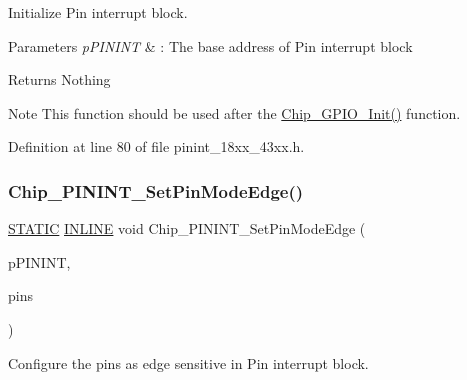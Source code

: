 Initialize Pin interrupt block. 


\begin{DoxyParams}{Parameters}
{\em p\+P\+I\+N\+I\+NT} & \+: The base address of Pin interrupt block \\
\hline
\end{DoxyParams}
\begin{DoxyReturn}{Returns}
Nothing 
\end{DoxyReturn}
\begin{DoxyNote}{Note}
This function should be used after the \hyperlink{group___g_p_i_o__18_x_x__43_x_x_gad799db2a825ded50fc7998f228db1b24}{Chip\+\_\+\+G\+P\+I\+O\+\_\+\+Init()} function. 
\end{DoxyNote}


Definition at line 80 of file pinint\+\_\+18xx\+\_\+43xx.\+h.

\mbox{\label{group___p_i_n_i_n_t__18_x_x__43_x_x_ga07505a16cf0d80d7dde607ebab062534}} 
\subsubsection{\texorpdfstring{Chip\+\_\+\+P\+I\+N\+I\+N\+T\+\_\+\+Set\+Pin\+Mode\+Edge()}{Chip\_PININT\_SetPinModeEdge()}}
{\footnotesize\ttfamily \hyperlink{group___l_p_c___types___public___macros_ga10b2d890d871e1489bb02b7e70d9bdfb}{S\+T\+A\+T\+IC} \hyperlink{spifi__18xx__43xx_8h_a2eb6f9e0395b47b8d5e3eeae4fe0c116}{I\+N\+L\+I\+NE} void Chip\+\_\+\+P\+I\+N\+I\+N\+T\+\_\+\+Set\+Pin\+Mode\+Edge (\begin{DoxyParamCaption}\item[{\hyperlink{struct_l_p_c___p_i_n___i_n_t___t}{L\+P\+C\+\_\+\+P\+I\+N\+\_\+\+I\+N\+T\+\_\+T} $\ast$}]{p\+P\+I\+N\+I\+NT,  }\item[{uint32\+\_\+t}]{pins }\end{DoxyParamCaption})}



Configure the pins as edge sensitive in Pin interrupt block. 


